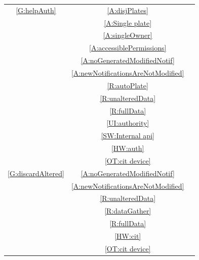 \documentclass{article}
\begin{document}
\begin{table}[H]
\begin{center}
\begin{tabular}{|c|c|c|}
			\hline
				\ref{G:helpAuth}				&\ref{A:disjPlates}						&\\
											&\ref{A:Single plate}					&\\
											&\ref{A:singleOwner}						&\\
											&\ref{A:accessiblePermissions}			&\\
											&\ref{A:noGeneratedModifiedNotif}		&\\
											&\ref{A:newNotificationsAreNotModified}	&\\
											&\ref{R:autoPlate}						&\\
											&\ref{R:unalteredData}					&\\
											&\ref{R:fullData}						&\\
											&\ref{UI:authority}						&\\
											&\ref{SW:Internal api}					&\\
											&\ref{HW:auth}							&\\
											&\ref{OT:cit device}						&\\
			\hline
				\ref{G:discardAltered}		&\ref{A:noGeneratedModifiedNotif}		&\\
											&\ref{A:newNotificationsAreNotModified}	&\\
											&\ref{R:unalteredData}					&\\
											&\ref{R:dataGather}						&\\
											&\ref{R:fullData}						&\\
											&\ref{HW:cit}							&\\
											&\ref{OT:cit device}						&\\
										

\end{tabular}
\end{center}
\end{table}
\end{document}
